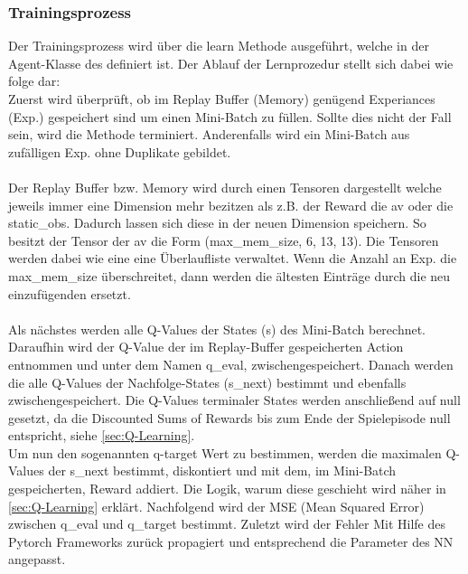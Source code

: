 \subsubsection{Trainingsprozess}
Der Trainingsprozess wird über die learn Methode ausgeführt, welche in der Agent-Klasse des definiert ist. Der Ablauf der Lernprozedur stellt sich dabei wie folge dar:\\
Zuerst wird überprüft, ob im Replay Buffer (Memory) genügend Experiances (Exp.) gespeichert sind um einen Mini-Batch zu füllen. Sollte dies nicht der Fall sein, wird die Methode terminiert. Anderenfalls wird ein Mini-Batch aus zufälligen Exp. ohne Duplikate gebildet.\\
\\Der Replay Buffer bzw. Memory wird durch einen Tensoren dargestellt welche jeweils immer eine Dimension mehr bezitzen als z.B. der Reward die av oder die static\_obs. Dadurch lassen sich diese in der neuen Dimension speichern. So besitzt der Tensor der av die Form (max\_mem\_size, 6, 13, 13). Die Tensoren werden dabei wie eine eine Überlaufliste verwaltet. Wenn die Anzahl an Exp. die max\_mem\_size überschreitet, dann werden die ältesten Einträge durch die neu einzufügenden ersetzt.\\
\\Als nächstes werden alle Q-Values der States (s) des Mini-Batch berechnet. Daraufhin wird der Q-Value der im Replay-Buffer gespeicherten Action entnommen und unter dem Namen q\_eval, zwischengespeichert. Danach werden die alle Q-Values der Nachfolge-States (s\_next) bestimmt und ebenfalls zwischengespeichert. Die Q-Values terminaler States werden anschließend auf null gesetzt, da die Discounted Sums of Rewards bis zum Ende der Spielepisode null entspricht, siehe \ref{sec:Q-Learning}.\\
Um nun den sogenannten q-target Wert zu bestimmen, werden die maximalen Q-Values der s\_next bestimmt, diskontiert und mit dem, im Mini-Batch gespeicherten, Reward addiert. Die Logik, warum diese geschieht wird näher in \ref{sec:Q-Learning} erklärt.
Nachfolgend wird der MSE (Mean Squared Error) zwischen q\_eval und q\_target bestimmt. Zuletzt wird der Fehler Mit Hilfe des Pytorch Frameworks zurück propagiert und entsprechend die Parameter des NN angepasst.
